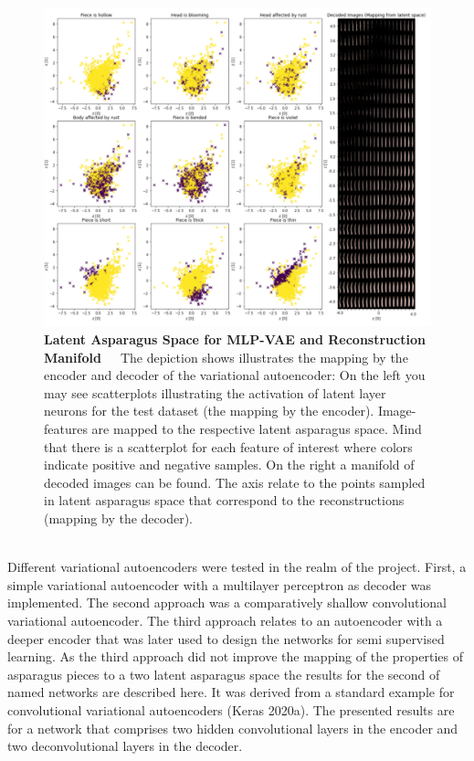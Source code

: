 \begin{figure}[h]
	\centering
	\includegraphics[scale=0.8]{Figures/chapter04/autoencoder_latent_asparagus.png}
	\decoRule
	\caption[Latent Asparagus Space for MLP-VAE and Reconstruction Manifold]{\textbf{Latent Asparagus Space for MLP-VAE and Reconstruction Manifold}~~~The depiction shows illustrates the mapping by the encoder and decoder of the variational autoencoder: On the left you may see scatterplots illustrating the activation of latent layer neurons for the test dataset (the mapping by the encoder). Image-features are mapped to the respective latent asparagus space. Mind that there is a scatterplot for each feature of interest where colors indicate positive and negative samples. On the right a manifold of decoded images can be found. The axis relate to the points sampled in latent asparagus space that correspond to the reconstructions (mapping by the decoder).}
	\label{fig:AutoencoderLatentSpace}
\end{figure}
\\
Different variational autoencoders were tested in the realm of the project. First, a simple variational autoencoder with a multilayer perceptron as decoder was implemented. The second approach was a comparatively shallow convolutional variational autoencoder. The third approach relates to an autoencoder with a deeper encoder that was later used to design the networks for semi supervised learning. As the third approach did not improve the mapping of the properties of asparagus pieces to a two latent asparagus space the results for the second of named networks are described here. It was derived from a standard example for convolutional variational autoencoders (Keras 2020a). The presented results are for a network that comprises two hidden convolutional layers in the encoder and two deconvolutional layers in the decoder. \\
